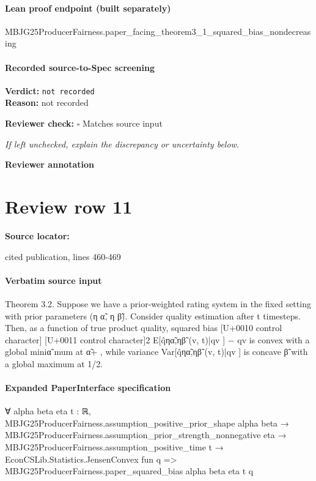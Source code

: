 \documentclass[10pt]{article}
\newcommand{\reviewerbox}{%
  \par\noindent\fbox{\parbox{0.96\linewidth}{\rule{0pt}{0.38in}}}\par
}
\newcommand{\reviewmatch}[1]{%
  \par\noindent\textbf{Reviewer check:} $\square$\; #1\par
  \noindent\emph{If left unchecked, explain the discrepancy or uncertainty below.}\par
}
\begin{document}
\paragraph{Lean proof endpoint (built separately)}\begin{ReviewVerbatim}
MBJG25ProducerFairness.paper_facing_theorem3_1_squared_bias_nondecreasing
\end{ReviewVerbatim}

\paragraph{Recorded source-to-Spec screening}
\textbf{Verdict:} \texttt{not recorded}
\\
\textbf{Reason:} not recorded
\reviewmatch{Matches source input}
\noindent\textbf{Reviewer annotation}\par
\reviewerbox
\clearpage
\hypertarget{source-claim-2dcf6dbcf162b5d0}{}
\section*{Review row 11}
\textbf{Source locator:} {\footnotesize\raggedright cited publication, lines 460-\allowbreak{}469\par}
\paragraph{Verbatim source input}
\begin{ReviewVerbatim}
Theorem 3.2. Suppose we have a prior-weighted rating system in the fixed setting with prior parameters (η α̃, η β̃). Consider quality estimation after t timesteps.
Then, as a function of true product quality, squared bias
[U+0010 control character]
[U+0011 control character]2
E[q̂ηα̃,ηβ̃ (v, t)|qv ] − qv
is convex with a global miniα̃
mum at α̃+
, while variance Var[q̂ηα̃,ηβ̃ (v, t)|qv ] is concave
β̃
with a global maximum at 1/2.
\end{ReviewVerbatim}


\paragraph{Expanded PaperInterface specification}
\begin{ReviewVerbatim}
∀ {alpha beta eta t : ℝ},
  MBJG25ProducerFairness.assumption_positive_prior_shape alpha beta →
    MBJG25ProducerFairness.assumption_prior_strength_nonnegative eta →
      MBJG25ProducerFairness.assumption_positive_time t →
        EconCSLib.Statistics.JensenConvex fun q => MBJG25ProducerFairness.paper_squared_bias alpha beta eta t q
\end{ReviewVerbatim}
\end{document}

